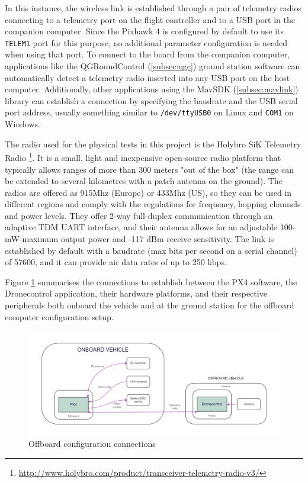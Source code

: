 In this instance, the wireless link is established through a pair of telemetry radios connecting to a telemetry port on the flight controller and to a USB port in the companion computer.
Since the Pixhawk 4 is configured by default to use its \texttt{TELEM1} port for this purpose, no additional parameter configuration is needed when using that port.
To connect to the board from the companion computer, applications like the QGRoundControl (\ref{subsec:qgc}) ground station software can automatically detect a telemetry radio inserted into any USB port on the host computer.
Additionally, other applications using the MavSDK (\ref{subsec:mavlink}) library can establish a connection by specifying the baudrate and the USB serial port address, usually something similar to \texttt{/dev/ttyUSB0} on Linux and \texttt{COM1} on Windows.

The radio used for the physical tests in this project is the Holybro SiK Telemetry Radio \footnote{\url{http://www.holybro.com/product/transceiver-telemetry-radio-v3/}}.
It is a small, light and inexpensive open-source radio platform that typically allows ranges of more than 300 meters "out of the box" (the range can be extended to several kilometres with a patch antenna on the ground).
The radios are offered as 915Mhz (Europe) or 433Mhz (US), so they can be used in different regions and comply with the regulations for frequency, hopping channels and power levels.
They offer 2-way full-duplex communication through an adaptive TDM UART interface, and their antenna allows for an adjustable 100-mW-maximum output power and -117 dBm receive sensitivity.
The link is established by default with a baudrate (max bits per second on a serial channel) of 57600, and it can provide air data rates of up to 250 kbps.

Figure \ref{fig:offboard-config} summarises the connections to establish between the PX4 software, the Dronecontrol application, their hardware platforms, and their respective peripherals both onboard the vehicle and at the ground station for the offboard computer configuration setup.

\begin{figure}
  \centering
  \includegraphics[width=\textwidth,keepaspectratio]{img/offboard-diagram.jpg}
  \caption{Offboard configuration connections}
  \label{fig:offboard-config}
\end{figure}


